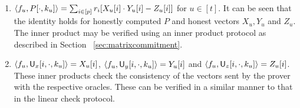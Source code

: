 \begin{enumerate}[{\rm 1.}]
	\item $\langle f_u,P[\cdot,k_u]\rangle = \sum_{i\in[p]} r_i[X_u[i]\cdot Y_u[i]
- Z_u[i]]$ for $u\in[t]$. It can be seen that the identity holds for honestly
computed $P$ and honest vectors $X_u,Y_u$ and $Z_u$. The inner product may be 
verified using an inner product protocol as described in Section ~\ref{sec:matrixcommitment}.
	
	\item $\langle f_u,\mathsf{U}_x[i,\cdot,k_u]\rangle = X_u[i]$, $\langle f_u,\mathsf{U}_y[i,\cdot,k_u]\rangle=Y_u[i]$ and $\langle f_u,\mathsf{U}_z[i,\cdot,k_u]\rangle=Z_u[i]$. These inner products check the consistency of the vectors sent by the prover with the respective oracles. These can be verified in a similar manner to that in the linear check protocol. 
\end{enumerate}

